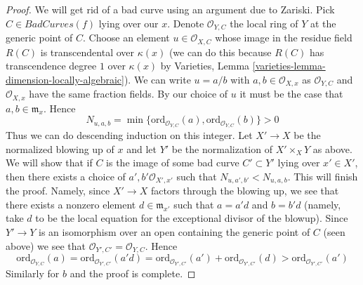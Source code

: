 \documentclass[10pt,a4paper]{amsart}
\theoremstyle{plain}
\theoremstyle{definition}
\theoremstyle{remark}
\numberwithin{equation}{subsection}
\begin{document}
\begin{proof}
\medskip\noindent
We will get rid of a bad curve using an argument due to Zariski.
Pick $C \in BadCurves(f)$ lying over our $x$. Denote $\mathcal{O}_{Y, C}$
the local ring of $Y$ at the generic point of $C$. Choose an element
$u \in \mathcal{O}_{X, C}$ whose image in the residue field
$R(C)$ is transcendental over $\kappa(x)$ (we can do this because
$R(C)$ has transcendence degree $1$ over $\kappa(x)$ by
Varieties, Lemma \ref{varieties-lemma-dimension-locally-algebraic}).
We can write $u = a/b$ with $a, b \in \mathcal{O}_{X, x}$ as
$\mathcal{O}_{Y, C}$ and $\mathcal{O}_{X, x}$ have the same
fraction fields. By our choice of $u$ it must be the case that
$a, b \in \mathfrak m_x$. Hence
$$
N_{u, a, b} = \min
\{\text{ord}_{\mathcal{O}_{Y, C}}(a), \text{ord}_{\mathcal{O}_{Y, C}}(b)\} > 0
$$
Thus we can do descending induction on this integer.
Let $X' \to X$ be the normalized blowing up of $x$
and let $Y'$ be the normalization of $X' \times_X Y$ as above. We will
show that if $C$ is the image of some bad curve $C' \subset Y'$
lying over $x' \in X'$, then
there exists a choice of $a', b' \mathcal{O}_{X', x'}$
such that $N_{u, a', b'} < N_{u, a, b}$. This will finish the proof.
Namely, since $X' \to X$ factors through the blowing up, we see that
there exists a nonzero element $d \in \mathfrak m_{x'}$ such that
$a = a' d$ and $b = b' d$ (namely, take $d$ to be the local equation
for the exceptional divisor of the blowup). Since $Y' \to Y$
is an isomorphism over an open containing the generic point of $C$
(seen above) we see that $\mathcal{O}_{Y', C'} = \mathcal{O}_{Y, C}$.
Hence
$$
\text{ord}_{\mathcal{O}_{Y, C}}(a) =
\text{ord}_{\mathcal{O}_{Y', C'}}(a' d) =
\text{ord}_{\mathcal{O}_{Y', C'}}(a') +
\text{ord}_{\mathcal{O}_{Y', C'}}(d) >
\text{ord}_{\mathcal{O}_{Y', C'}}(a')
$$
Similarly for $b$ and the proof is complete.
\end{proof}
\end{document}
